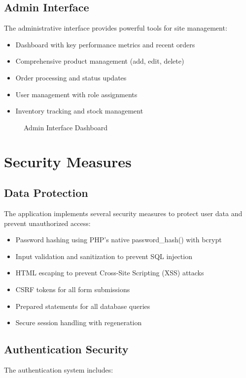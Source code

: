 \documentclass[14pt,a4paper]{article}
\begin{document}
\subsection{Admin Interface}

The administrative interface provides powerful tools for site management:

\begin{itemize}
	\item Dashboard with key performance metrics and recent orders
	\item Comprehensive product management (add, edit, delete)
	\item Order processing and status updates
	\item User management with role assignments
	\item Inventory tracking and stock management
\end{itemize}

\begin{figure}[H]
	\centering
	\caption{Admin Interface Dashboard}
	\label{fig:admin-dashboard}
\end{figure}

\section{Security Measures}

\subsection{Data Protection}
The application implements several security measures to protect user data and prevent unauthorized access:

\begin{itemize}
	\item Password hashing using PHP's native password\_hash() with bcrypt
	\item Input validation and sanitization to prevent SQL injection
	\item HTML escaping to prevent Cross-Site Scripting (XSS) attacks
	\item CSRF tokens for all form submissions
	\item Prepared statements for all database queries
	\item Secure session handling with regeneration
\end{itemize}

\subsection{Authentication Security}
The authentication system includes:
\end{document}
